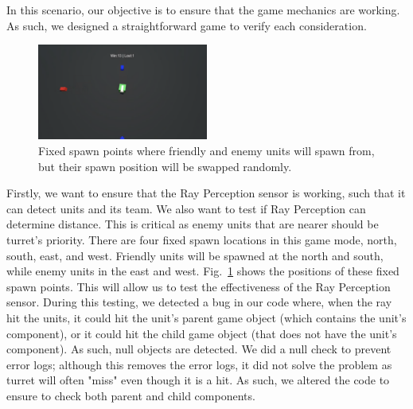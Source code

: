 \documentclass[conference]{IEEEtran}
\begin{document}
In this scenario, our objective is to ensure that the game mechanics are working. As such, we designed a straightforward game to verify each consideration. 

\begin{figure}[h]
\centerline{\includegraphics[width=0.5\textwidth]{assets/fixed_spawn}}
\caption{Fixed spawn points where friendly and enemy units will spawn from, but their spawn position will be swapped randomly.}
\label{fixed_spawn}
\end{figure}

Firstly, we want to ensure that the Ray Perception sensor is working, such that it can detect units and its team. We also want to test if Ray Perception can determine distance. This is critical as enemy units that are nearer should be turret's priority. There are four fixed spawn locations in this game mode, north, south, east, and west. Friendly units will be spawned at the north and south, while enemy units in the east and west. Fig.~\ref{fixed_spawn} shows the positions of these fixed spawn points. This will allow us to test the effectiveness of the Ray Perception sensor. During this testing, we detected a bug in our code where, when the ray hit the units, it could hit the unit's parent game object (which contains the unit's component), or it could hit the child game object (that does not have the unit's component). As such, null objects are detected. We did a null check to prevent error logs; although this removes the error logs, it did not solve the problem as turret will often "miss" even though it is a hit. As such, we altered the code to ensure to check both parent and child components. 
\end{document}
